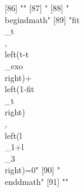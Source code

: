 [86] ""                                                                                                                                                                                                                                                                                              
[87] "%
[88] "\\begin{dmath}"                                                                                                                                                                                                                                                                                
[89] "{{fit\\_t}}\\, \\left({t}-{{t\\_exo}}\\right)+\\left(1-{{fit\\_t}}\\right)\\, \\left({{l\\_1}}+{{l\\_3}}\\right)=0"                                                                                                                                                                            
[90] "\\end{dmath}"                                                                                                                                                                                                                                                                                  
[91] ""                                                                                                                                                                                                                                                                                              

